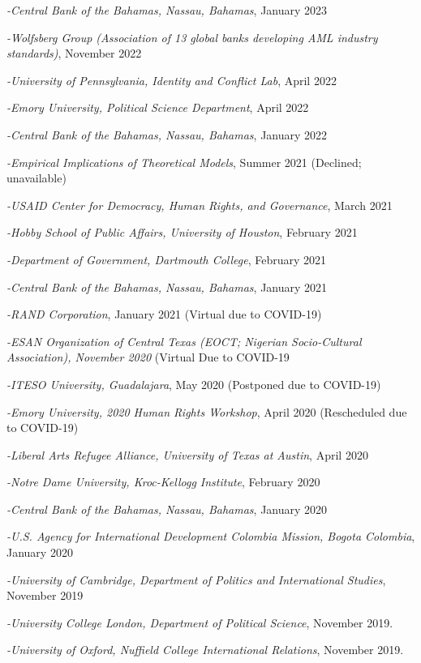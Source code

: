\documentclass[10pt]{article}
\begin{document}
\begin{etaremune}
\item\textit{-Central Bank of the Bahamas, Nassau, Bahamas}, January 2023
\item\textit{-Wolfsberg Group (Association of 13 global banks developing AML industry standards)}, November 2022
\item\textit{-University of Pennsylvania, Identity and Conflict Lab}, April 2022 
\item\textit{-Emory University, Political Science Department}, April 2022 
\item\textit{-Central Bank of the Bahamas, Nassau, Bahamas}, January 2022
\item\textit{-Empirical Implications of Theoretical Models}, Summer 2021 (Declined;  unavailable)
\item\textit{-USAID Center for Democracy, Human Rights, and Governance}, March 2021
\item\textit{-Hobby School of Public Affairs, University of Houston}, February 2021
\item\textit{-Department of Government, Dartmouth College}, February 2021 
\item\textit{-Central Bank of the Bahamas, Nassau, Bahamas}, January 2021
\item\textit{-RAND Corporation}, January 2021 (Virtual due to COVID-19)
\item\textit{-ESAN Organization of Central Texas (EOCT; Nigerian Socio-Cultural Association), November 2020} (Virtual Due to COVID-19
\item\textit{-ITESO University, Guadalajara}, May 2020 (Postponed due to COVID-19)
\item\textit{-Emory University, 2020 Human Rights Workshop}, April 2020  (Rescheduled due to COVID-19)
\item\textit{-Liberal Arts Refugee Alliance, University of Texas at Austin}, April 2020
\item\textit{-Notre Dame University, Kroc-Kellogg Institute}, February 2020
\item\textit{-Central Bank of the Bahamas, Nassau, Bahamas}, January 2020
\item\textit{-U.S. Agency for International Development Colombia Mission, Bogota Colombia}, January 2020
\item\textit{-University of Cambridge, Department of Politics and International Studies}, November 2019
\item\textit{-University College London, Department of Political Science}, November 2019.
\item\textit{-University of Oxford, Nuffield College International Relations}, November 2019.

\end{etaremune}
\end{document}
